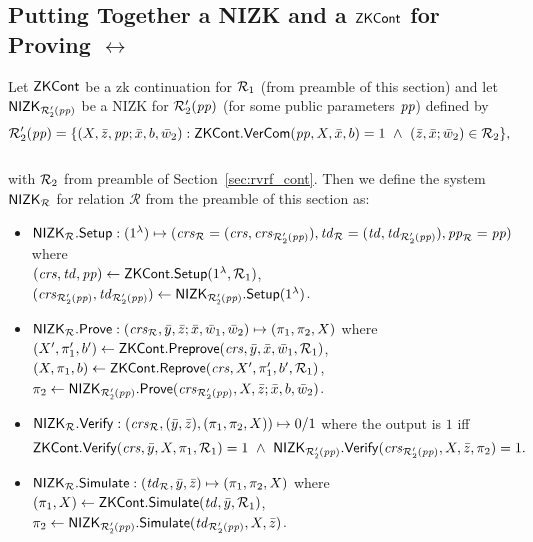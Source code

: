 \subsection{Putting Together a NIZK and a $\ZKCont$  for Proving $\rel$} \label{sec:nizkR}

Let $\ZKCont$ be a zk continuation for $\relone$ (from preamble of this section) and 
let $\nizktwo$ be a NIZK for $\reltwo'(\pp)$ (for some public parameters $\pp$) defined by \\ 
$$\reltwo'(\pp) = \{(X, \barz, \pp; \barx, b, \baromega_2): \ZKCont.\VerifyCom(\pp, X, \barx, b) =1\ 
\wedge \ (\barz, \barx; \baromega_2) \in \reltwo \},$$ \\
\noindent with $\reltwo$ from preamble of Section~\ref{sec:rvrf_cont}. Then we define the system $\nizkR$ for relation $\mathcal{R}$ 
from the preamble of this section as:
\begin{itemize}
\item $\nizkR.\Setup: (1^{\lambda}) \mapsto (\crsR = (\crs,\crstwo), \twR = (\tw, \twtwo), \pp_\rel = \pp)$ where \\
$(\crs, \tw, \pp) \leftarrow \ZKCont.\Setup(1^{\lambda}, \relone)$, $(\crstwo, \twtwo) \leftarrow \nizktwo.\Setup(1^{\lambda})$.


\item $\nizkR.\Prove: (\crsR,\bary, \barz; \barx, \baromega_1, \baromega_2 ) \mapsto (\pi_1, \pi_2, X)$ where \\
$(X', \pi'_1, b')\leftarrow \ZKCont.\Preprove(\crs, \bar{y}, \bar{x}, \baromega_1, \relone)$, 
$(X, \pi_1, b) \leftarrow \ZKCont.\Reprove(\crs, X', \pi_1', b', \relone)$, \\
$\pi_2 \leftarrow \nizktwo.\Prove(\crstwo, X, \barz; \barx, b, \baromega_2)$. 

\item $\nizkR.\Verify: (\crsR,(\bary, \barz), (\pi_1, \pi_2, X)) \mapsto 0/1$ where the output is $1$ iff 
$$\ZKCont.\Verify(\crs, \bar{y}, X, \pi_1, \relone) = 1 \  \wedge \ \nizktwo.\Verify(\crstwo, X, \barz, \pi_2) =1.$$

\item $\nizkR.\Sim: (\twR, \bary, \barz) \mapsto (\pi_1, \pi_2, X)$ where \\
$(\pi_1, X) \leftarrow \ZKCont.\Sim(\tw, \bary, \relone)$, $\pi_2 \leftarrow \nizktwo.\Sim(\twtwo, X, \barz)$.
 \end{itemize}
